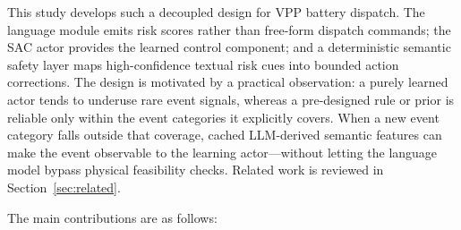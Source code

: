 \documentclass{ieeeaccess}
\begin{document}
This study develops such a decoupled design for VPP battery dispatch. The language module emits risk scores rather than free-form dispatch commands; the SAC actor provides the learned control component; and a deterministic semantic safety layer maps high-confidence textual risk cues into bounded action corrections. The design is motivated by a practical observation: a purely learned actor tends to underuse rare event signals, whereas a pre-designed rule or prior is reliable only within the event categories it explicitly covers. When a new event category falls outside that coverage, cached LLM-derived semantic features can make the event observable to the learning actor---without letting the language model bypass physical feasibility checks. Related work is reviewed in Section~\ref{sec:related}.

The main contributions are as follows:
\end{document}
